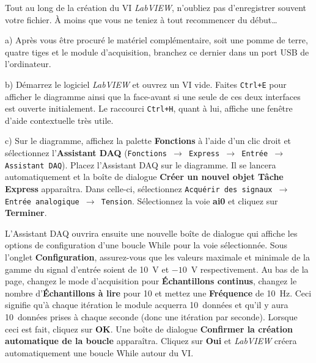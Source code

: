 \documentclass[canadien,12pt,oneside,letterpaper]{article}
\begin{document}
Tout au long de la création du VI \textit{LabVIEW}, n'oubliez pas d'enregistrer souvent votre fichier. À moins que vous ne teniez à tout recommencer du début\dots

a) Après vous être procuré le matériel complémentaire, soit une pomme de terre, quatre tiges et le module d'acquisition, branchez ce dernier dans un port USB de l'ordinateur.

b) Démarrez le logiciel \textit{LabVIEW} et ouvrez un VI vide. Faites \texttt{Ctrl+E} pour afficher le diagramme ainsi que la face-avant si une seule de ces deux interfaces est ouverte initialement. Le raccourci \texttt{Ctrl+H}, quant à lui, affiche une fenêtre d'aide contextuelle très utile.

c) Sur le diagramme, affichez la palette \textbf{Fonctions} à l'aide d'un clic droit et sélectionnez l'\textbf{Assistant DAQ} (\texttt{Fonctions $\rightarrow$ Express $\rightarrow$ Entrée $\rightarrow$ Assistant DAQ}). Placez l'Assistant DAQ sur le diagramme. Il se lancera automatiquement et la boîte de dialogue \textbf{Créer un nouvel objet Tâche Express} apparaîtra. Dans celle-ci, sélectionnez \texttt{Acquérir des signaux $\rightarrow$ Entrée analogique $\rightarrow$ Tension}. Sélectionnez la voie \textbf{ai0} et cliquez sur \textbf{Terminer}.

L'Assistant DAQ ouvrira ensuite une nouvelle boîte de dialogue qui affiche les options de configuration d'une boucle While pour la voie sélectionnée. Sous l'onglet \textbf{Configuration}, assurez-vous que les valeurs maximale et minimale de la gamme du signal d'entrée soient de 10~V et $-10$~V respectivement. Au bas de la page, changez le mode d'acquisition pour \textbf{Échantillons continus}, changez le nombre d'\textbf{Échantillons à lire} pour 10 et mettez une \textbf{Fréquence} de 10~Hz. Ceci signifie qu'à chaque itération le module acquerra 10~données et qu'il y aura 10~données prises à chaque seconde (donc une itération par seconde). Lorsque ceci est fait, cliquez sur \textbf{OK}. Une boîte de dialogue \textbf{Confirmer la création automatique de la boucle} apparaîtra. Cliquez sur \textbf{Oui} et \textit{LabVIEW} créera automatiquement une boucle While autour du VI.
\end{document}
